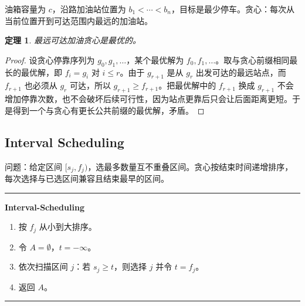 \documentclass[UTF8,a4paper,11pt]{ctexart}
\newtheorem{theorem}{定理}[section]
\newenvironment{algobox}[1]
{\par\medskip\noindent\begin{minipage}{0.96\linewidth}\hrule\vspace{0.35em}\textbf{#1}\par\vspace{0.25em}\small}
{\par\vspace{0.25em}\hrule\end{minipage}\par\medskip}
\begin{document}
油箱容量为 $c$，沿路加油站位置为 $b_1<\cdots<b_n$，目标是最少停车。贪心：每次从当前位置开到可达范围内最远的加油站。

\begin{theorem}
最远可达加油贪心是最优的。
\end{theorem}
\begin{proof}
设贪心停靠序列为 $g_0,g_1,\ldots$，某个最优解为 $f_0,f_1,\ldots$。取与贪心前缀相同最长的最优解，即 $f_i=g_i$ 对 $i\le r$。由于 $g_{r+1}$ 是从 $g_r$ 出发可达的最远站点，而 $f_{r+1}$ 也必须从 $g_r$ 可达，所以 $g_{r+1}\ge f_{r+1}$。把最优解中的 $f_{r+1}$ 换成 $g_{r+1}$ 不会增加停靠次数，也不会破坏后续可行性，因为站点更靠后只会让后面距离更短。于是得到一个与贪心有更长公共前缀的最优解，矛盾。
\end{proof}

\subsection{Interval Scheduling}

问题：给定区间 $[s_j,f_j)$，选最多数量互不重叠区间。贪心按结束时间递增排序，每次选择与已选区间兼容且结束最早的区间。

\begin{algobox}{Interval-Scheduling}
\begin{enumerate}
  \item 按 $f_j$ 从小到大排序。
  \item 令 $A=\emptyset$，$t=-\infty$。
  \item 依次扫描区间 $j$：若 $s_j\ge t$，则选择 $j$ 并令 $t=f_j$。
  \item 返回 $A$。
\end{enumerate}
\end{algobox}

\begin{center}
\end{center}
\end{document}
